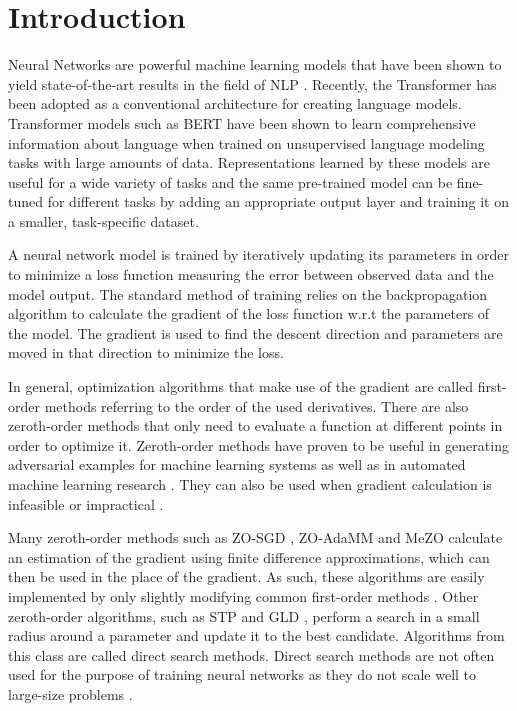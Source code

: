 \chapter{Introduction}\label{chapter:introduction}

Neural Networks are powerful machine 
learning models that have been shown to 
yield state-of-the-art results 
in the field of \acf{NLP} \parencite{goldberg2016primer}.
Recently, the Transformer \parencite{transformer}
has been adopted as a conventional architecture for 
creating language models. Transformer models such as 
BERT \parencite{bert} have been shown to learn 
comprehensive information about language when trained on 
unsupervised language modeling tasks with 
large amounts of data. Representations
learned by these models are useful for a wide variety of 
tasks and the same pre-trained model can be fine-tuned 
for different tasks by adding an appropriate output layer
and training it on a smaller, task-specific dataset. 

A neural network model is trained by iteratively updating
its parameters in order to minimize a 
loss function measuring the error between 
observed data and the model output. 
The standard method of training
relies on the backpropagation algorithm 
\parencite{backprop} to calculate the gradient 
of the loss function w.r.t the parameters 
of the model. The gradient is used to find the descent 
direction and parameters are moved in that
direction to minimize the loss. 

In general, optimization algorithms that make use of 
the gradient are called first-order methods referring
to the order of the used derivatives. 
There are also zeroth-order
methods that only need to evaluate a function at 
different points in order to optimize it. Zeroth-order
methods have proven to be useful in generating
adversarial examples for machine learning 
systems \parencite{adversarial} as well as in 
automated machine learning research \parencite{automl}.
They can also be used when gradient calculation 
is infeasible or impractical \parencite{primer-zo}. 

Many zeroth-order
methods such as ZO-SGD \parencite{spsa}, 
ZO-AdaMM \parencite{zoadamm} and MeZO \parencite{mezo}
calculate an estimation of the gradient using 
finite difference approximations, which can then be used
in the place of the gradient. As such, these algorithms 
are easily implemented by only slightly modifying 
common first-order methods \parencite{primer-zo}. 
Other zeroth-order algorithms, such as 
\ac{STP} \parencite{stp} and \acf{GLD} \parencite{gld}, 
perform a search in a small radius around a parameter 
and update it to the best candidate. 
Algorithms from this class are called direct search 
methods. 
Direct search methods are not often used for the purpose
of training neural networks as they do not scale well 
to large-size problems \parencite{directsearch}. 

